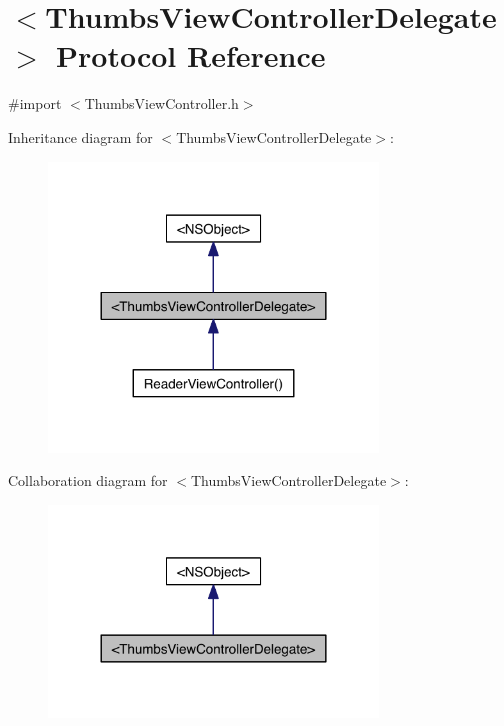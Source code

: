 \hypertarget{protocol_thumbs_view_controller_delegate-p}{\section{$<$Thumbs\-View\-Controller\-Delegate$>$ Protocol Reference}
\label{db/d4e/protocol_thumbs_view_controller_delegate-p}
}


{\ttfamily \#import $<$Thumbs\-View\-Controller.\-h$>$}



Inheritance diagram for $<$Thumbs\-View\-Controller\-Delegate$>$\-:
\nopagebreak
\begin{figure}[H]
\begin{center}
\leavevmode
\includegraphics[width=248pt]{d0/da2/protocol_thumbs_view_controller_delegate-p__inherit__graph}
\end{center}
\end{figure}


Collaboration diagram for $<$Thumbs\-View\-Controller\-Delegate$>$\-:
\nopagebreak
\begin{figure}[H]
\begin{center}
\leavevmode
\includegraphics[width=248pt]{d6/dc3/protocol_thumbs_view_controller_delegate-p__coll__graph}
\end{center}
\end{figure}
